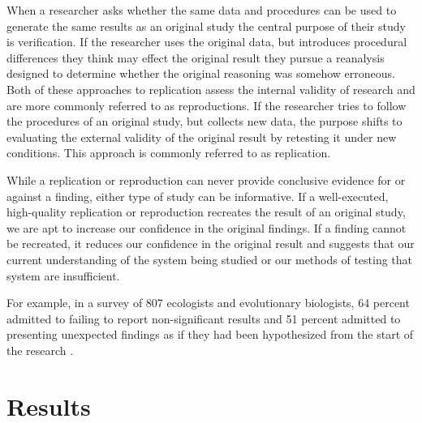 \documentclass[]{interact}
\theoremstyle{plain}%
\theoremstyle{definition}
\theoremstyle{remark}
\begin{document}
When a researcher asks whether the same data and procedures can be used to generate the same results as an original study the central purpose of their study is verification.
If the researcher uses the original data, but introduces procedural differences they think may effect the original result they pursue a reanalysis designed to determine whether the original reasoning was somehow erroneous. 
Both of these approaches to replication assess the internal validity of research and are more commonly referred to as reproductions.
If the researcher tries to follow the procedures of an original study, but collects new data, the purpose shifts to evaluating the external validity of the original result by retesting it under new conditions.
This approach is commonly referred to as replication. 

While a replication or reproduction can never provide conclusive evidence for or against a finding, either type of study can be informative. 
If a well-executed, high-quality replication or reproduction recreates the result of an original study, we are apt to increase our confidence in the original findings. 
If a finding cannot be recreated, it reduces our confidence in the original result and suggests that our current understanding of the system being studied or our methods of testing that system are insufficient.

For example, in a survey of 807 ecologists and evolutionary biologists, 64 percent admitted to failing to report non-significant results and 51 percent admitted to presenting unexpected findings as if they had been hypothesized from the start of the research \citep{fraser2018questionable}.

\section*{Results}

\end{document}
